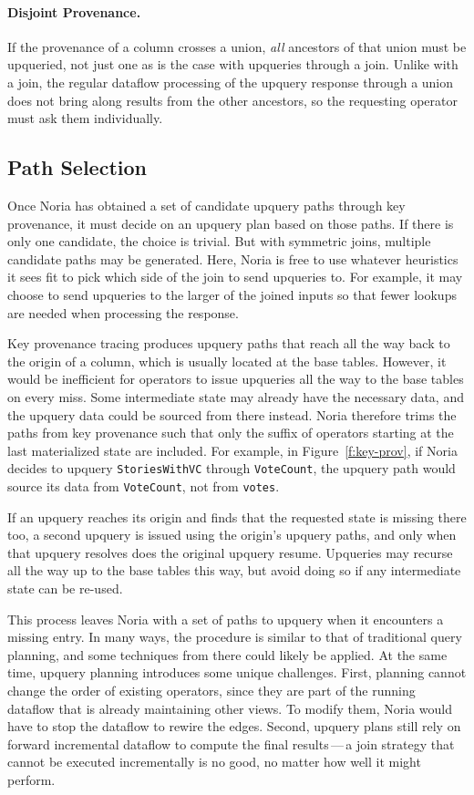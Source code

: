 \paragraph{Disjoint Provenance.}
If the provenance of a column crosses a union, \emph{all} ancestors of that
union must be upqueried, not just one as is the case with upqueries through a
join. Unlike with a join, the regular dataflow processing of the upquery
response through a union does not bring along results from the other ancestors,
so the requesting operator must ask them individually.

\subsection{Path Selection}
\label{s:upquery:selection}

Once Noria has obtained a set of candidate upquery paths through key provenance,
it must decide on an upquery plan based on those paths. If there is only one
candidate, the choice is trivial. But with symmetric joins, multiple candidate
paths may be generated. Here, Noria is free to use whatever heuristics it sees
fit to pick which side of the join to send upqueries to. For example, it may
choose to send upqueries to the larger of the joined inputs so that fewer
lookups are needed when processing the response.

Key provenance tracing produces upquery paths that reach all the way back to the
origin of a column, which is usually located at the base tables. However, it
would be inefficient for operators to issue upqueries all the way to the base
tables on every miss. Some intermediate state may already have the necessary
data, and the upquery data could be sourced from there instead. Noria therefore
trims the paths from key provenance such that only the suffix of operators
starting at the last materialized state are included. For example, in
Figure~\ref{f:key-prov}, if Noria decides to upquery \texttt{StoriesWithVC}
through \texttt{VoteCount}, the upquery path would source its data from
\texttt{VoteCount}, not from \texttt{votes}.

If an upquery reaches its origin and finds that the requested state is missing
there too, a second upquery is issued using the origin's upquery paths, and only
when that upquery resolves does the original upquery resume. Upqueries may
recurse all the way up to the base tables this way, but avoid doing so if any
intermediate state can be re-used.

This process leaves Noria with a set of paths to upquery when it encounters a
missing entry. In many ways, the procedure is similar to that of traditional
query planning, and some techniques from there could likely be applied. At the
same time, upquery planning introduces some unique challenges. First, planning
cannot change the order of existing operators, since they are part of the
running dataflow that is already maintaining other views. To modify them, Noria
would have to stop the dataflow to rewire the edges. Second, upquery plans still
rely on forward incremental dataflow to compute the final results\,---\,a join
strategy that cannot be executed incrementally is no good, no matter how well it
might perform.

